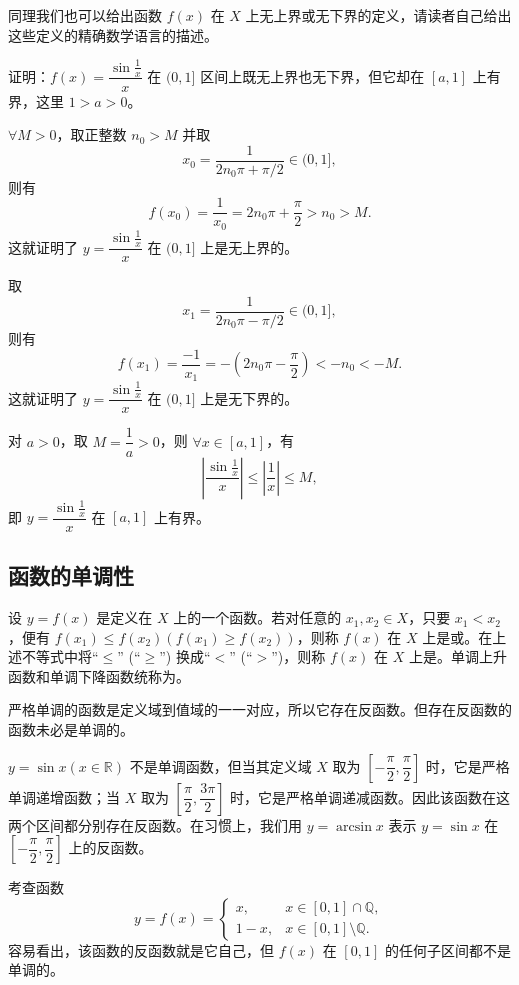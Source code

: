 \documentclass[UTF8,12pt,a4paper,fontset=fandol]{ctexbook}
\begin{document}
同理我们也可以给出函数 $f(x)$ 在 $X$ 上无上界或无下界的定义，请读者自己给出这些定义的精确数学语言的描述。

\noindent{}\quad 证明：$f(x)=\dfrac{\sin\frac1x}{x}$ 在 $(0,1]$ 区间上既无上界也无下界，但它却在 $[a,1]$ 上有界，这里 $1>a>0$。

\noindent{}\quad $\forall M>0$，取正整数 $n_0>M$ 并取
\[
  x_0=\frac{1}{2n_0\pi+\pi/2}\in(0,1],
\]
则有
\[
  f(x_0)=\frac{1}{x_0}=2n_0\pi+\frac{\pi}{2}>n_0>M.
\]
这就证明了 $y=\dfrac{\sin\frac1x}{x}$ 在 $(0,1]$ 上是无上界的。

取
\[
  x_1=\frac{1}{2n_0\pi-\pi/2}\in(0,1],
\]
则有
\[
  f(x_1)=\frac{-1}{x_1}=-\left(2n_0\pi-\frac{\pi}{2}\right)<-n_0<-M.
\]
这就证明了 $y=\dfrac{\sin\frac1x}{x}$ 在 $(0,1]$ 上是无下界的。

对 $a>0$，取 $M=\dfrac1a>0$，则 $\forall x\in[a,1]$，有
\[
  \left|\frac{\sin\frac1x}{x}\right|\leqslant \left|\frac1x\right|\leqslant M,
\]
即 $y=\dfrac{\sin\frac1x}{x}$ 在 $[a,1]$ 上有界。

\subsection{函数的单调性}

设 $y=f(x)$ 是定义在 $X$ 上的一个函数。若对任意的 $x_1,x_2\in X$，只要 $x_1<x_2$，便有 $f(x_1)\leqslant f(x_2)(f(x_1)\geqslant f(x_2))$，则称 $f(x)$ 在 $X$ 上是或。在上述不等式中将``$\leqslant$'' (``$\geqslant$'') 换成``$<$'' (``$>$'')，则称 $f(x)$ 在 $X$ 上是。单调上升函数和单调下降函数统称为。

严格单调的函数是定义域到值域的一一对应，所以它存在反函数。但存在反函数的函数未必是单调的。

\noindent{}\quad $y=\sin x(x\in\mathbb{R})$ 不是单调函数，但当其定义域 $X$ 取为 $\left[-\dfrac\pi2,\dfrac\pi2\right]$ 时，它是严格单调递增函数；当 $X$ 取为 $\left[\dfrac\pi2,\dfrac{3\pi}2\right]$ 时，它是严格单调递减函数。因此该函数在这两个区间都分别存在反函数。在习惯上，我们用 $y=\arcsin x$ 表示 $y=\sin x$ 在 $\left[-\dfrac\pi2,\dfrac\pi2\right]$ 上的反函数。

\noindent{}\quad 考查函数
\[
  y=f(x)=
  \begin{cases}
    x, & x\in[0,1]\cap\mathbb{Q},\\
    1-x, & x\in[0,1]\setminus\mathbb{Q}.
  \end{cases}
\]
容易看出，该函数的反函数就是它自己，但 $f(x)$ 在 $[0,1]$ 的任何子区间都不是单调的。
\end{document}
